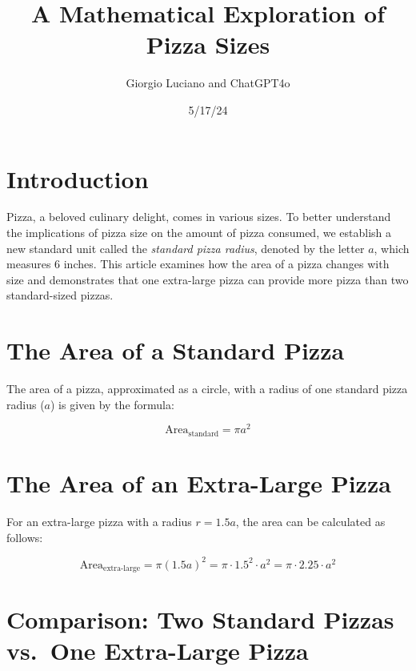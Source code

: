 \documentclass[
  letterpaper,
  DIV=11,
  numbers=noendperiod]{scrartcl}
\title{A Mathematical Exploration of Pizza Sizes}
\author{Giorgio Luciano and ChatGPT4o}
\date{5/17/24}
\begin{document}
\maketitle
\ifdefined\Shaded\renewenvironment{Shaded}{\begin{tcolorbox}[borderline west={3pt}{0pt}{shadecolor}, breakable, sharp corners, interior hidden, enhanced, boxrule=0pt, frame hidden]}{\end{tcolorbox}}\fi

\hypertarget{introduction}{%
\section{Introduction}\label{introduction}}

Pizza, a beloved culinary delight, comes in various sizes. To better
understand the implications of pizza size on the amount of pizza
consumed, we establish a new standard unit called the \emph{standard
pizza radius}, denoted by the letter \(a\), which measures 6 inches.
This article examines how the area of a pizza changes with size and
demonstrates that one extra-large pizza can provide more pizza than two
standard-sized pizzas.

\hypertarget{the-area-of-a-standard-pizza}{%
\section{The Area of a Standard
Pizza}\label{the-area-of-a-standard-pizza}}

The area of a pizza, approximated as a circle, with a radius of one
standard pizza radius (\(a\)) is given by the formula:

\[
\text{Area}_{\text{standard}} = \pi a^2
\]

\hypertarget{the-area-of-an-extra-large-pizza}{%
\section{The Area of an Extra-Large
Pizza}\label{the-area-of-an-extra-large-pizza}}

For an extra-large pizza with a radius \(r = 1.5a\), the area can be
calculated as follows:

\[
\text{Area}_{\text{extra-large}} = \pi (1.5a)^2 = \pi \cdot 1.5^2 \cdot a^2 = \pi \cdot 2.25 \cdot a^2
\]

\hypertarget{comparison-two-standard-pizzas-vs.-one-extra-large-pizza}{%
\section{Comparison: Two Standard Pizzas vs.~One Extra-Large
Pizza}\label{comparison-two-standard-pizzas-vs.-one-extra-large-pizza}}
\end{document}
